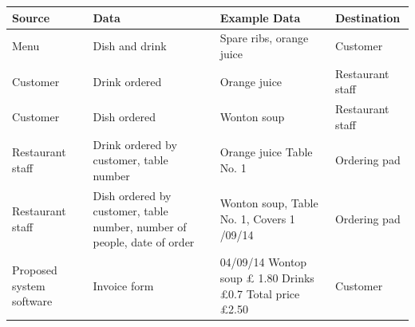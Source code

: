 \begin{center}

\begin{tabular}{ | p{2cm}| p{3cm} | p{2cm} | p{2cm} |  }
    \hline
    \textbf{Source} & \textbf{Data} & \textbf{Example Data} & \textbf{Destination} \\ \hline
    Menu &Dish and drink & Spare ribs, orange juice &Customer \\ \hline
    Customer &Drink ordered & Orange juice &Restaurant staff \\ \hline
    Customer & Dish ordered & Wonton soup& Restaurant staff \\ \hline
    Restaurant staff &Drink ordered by customer, \newline table number & Orange juice  \newline Table No. 1& Ordering pad \\ \hline
    Restaurant staff & Dish ordered by customer, \newline table number, number of people, \newline date of order & Wonton soup, \newline Table No. 1, \newline Covers 1 \newline 04/09/14 & Ordering pad \\ \hline
    Proposed system software & Invoice form & 04/09/14 \newline Wontop soup £ 1.80 \newline Drinks £0.7 \newline Total price £2.50 & Customer  \\ 
    \hline
\end{tabular}
\label{tab:range_examples}
\end{center}

\newpage


